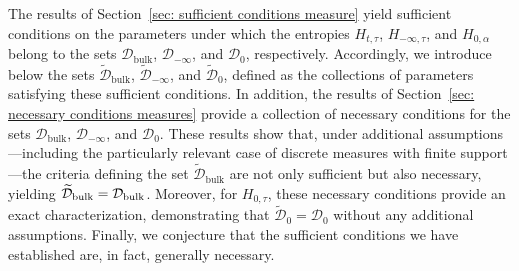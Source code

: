 \documentclass[aps,pra,11pt,onecolumn,nofootinbib,tightenlines]{revtex4-2}
\theoremstyle{definition}
\begin{document}
The results of Section~\ref{sec: sufficient conditions measure} yield sufficient conditions on the parameters under which the entropies $H_{t,\tau}$, $H_{-\infty,\tau}$, and $H_{0,\alpha}$ belong to the sets $\mathcal{D}_{\mathrm{bulk}}$, $\mathcal{D}_{-\infty}$, and $\mathcal{D}_{0}$, respectively. Accordingly, we introduce below the sets $\widetilde{\mathcal{D}}_{\mathrm{bulk}}$, $\widetilde{\mathcal{D}}_{-\infty}$, and $\widetilde{\mathcal{D}}_{0}$, defined as the collections of parameters satisfying these sufficient conditions. In addition, the results of Section~\ref{sec: necessary conditions measures} provide a collection of necessary conditions for the sets $\mathcal{D}_{\mathrm{bulk}}$, $\mathcal{D}_{-\infty}$, and $\mathcal{D}_{0}$.
These results show that, under additional assumptions—including the particularly relevant case of discrete measures with finite support—the criteria defining the set $\widetilde{\mathcal{D}}_{\mathrm{bulk}}$ are not only sufficient but also necessary, yielding
\(\widetilde{\mathcal{D}}_{\rm bulk} = \mathcal{D}_{\rm bulk}\). Moreover, for \(H_{0,\tau}\), these necessary conditions provide an exact characterization, demonstrating that \(\widetilde{\mathcal{D}}_0 = \mathcal{D}_0\) without any additional assumptions. 
Finally, we conjecture that the sufficient conditions we have established are, in fact, generally necessary.
\end{document}
